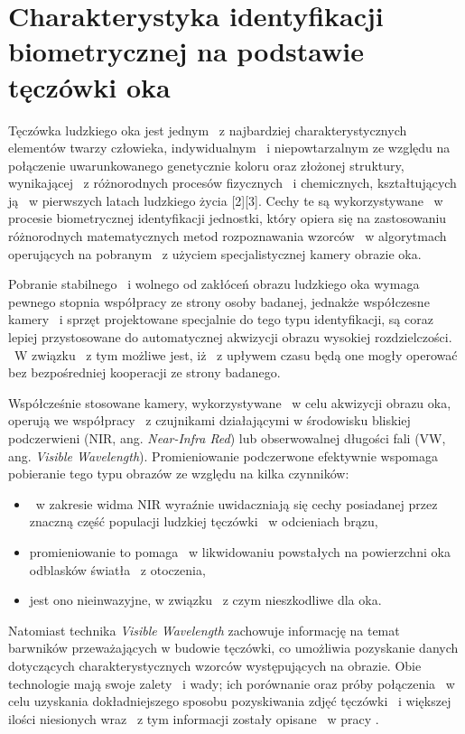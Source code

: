 
\section{Charakterystyka identyfikacji biometrycznej na podstawie tęczówki oka}
\label{sec:zawartoscPracy}

Tęczówka ludzkiego oka jest jednym ~z najbardziej charakterystycznych elementów twarzy człowieka, indywidualnym ~i niepowtarzalnym ze względu na połączenie uwarunkowanego genetycznie koloru oraz złożonej struktury, wynikającej ~z różnorodnych procesów fizycznych ~i chemicznych, kształtujących ją ~w pierwszych latach ludzkiego życia [2][3]. Cechy te są wykorzystywane ~w procesie biometrycznej identyfikacji jednostki, który opiera się na zastosowaniu różnorodnych matematycznych metod rozpoznawania wzorców ~w algorytmach operujących na pobranym ~z użyciem specjalistycznej kamery obrazie oka.

Pobranie stabilnego ~i wolnego od zakłóceń obrazu ludzkiego oka wymaga pewnego stopnia współpracy ze strony osoby badanej, jednakże współczesne kamery ~i sprzęt projektowane specjalnie do tego typu identyfikacji, są  coraz lepiej przystosowane do automatycznej akwizycji obrazu wysokiej rozdzielczości. ~W związku ~z tym możliwe jest, iż ~z upływem czasu będą one mogły operować bez bezpośredniej kooperacji ze strony badanego.

Współcześnie stosowane kamery, wykorzystywane ~w celu akwizycji obrazu oka, operują we współpracy ~z czujnikami działającymi w środowisku bliskiej podczerwieni (NIR, ang. \emph{Near-Infra Red}) lub obserwowalnej długości fali (VW, ang. \emph{Visible Wavelength}). Promieniowanie podczerwone efektywnie wspomaga pobieranie tego typu obrazów ze względu na kilka czynników:
\begin{itemize} 
\item ~w zakresie widma NIR wyraźnie uwidaczniają się cechy posiadanej przez znaczną część populacji ludzkiej tęczówki ~w  odcieniach brązu,
\item promieniowanie to pomaga ~w likwidowaniu powstałych na powierzchni oka odblasków światła ~z otoczenia,
\item jest ono nieinwazyjne, w związku ~z czym nieszkodliwe dla oka.
\end{itemize}
Natomiast technika \emph{Visible Wavelength} zachowuje informację na temat barwników przeważających w budowie tęczówki, co umożliwia pozyskanie danych dotyczących charakterystycznych wzorców występujących na obrazie. Obie technologie mają swoje zalety ~i wady; ich porównanie oraz próby połączenia ~w celu uzyskania dokładniejszego sposobu pozyskiwania zdjęć tęczówki ~i większej ilości niesionych wraz ~z tym informacji zostały opisane ~w pracy \cite{Hos10}. 

